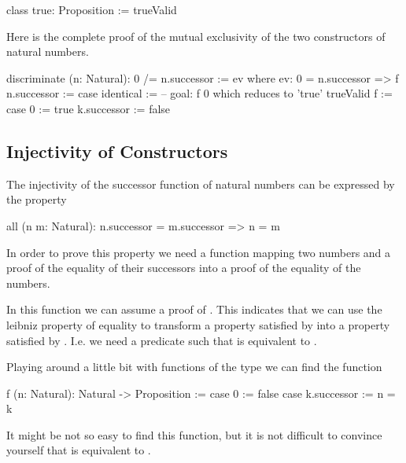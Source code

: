 \begin{alba}
    class true: Proposition := trueValid
\end{alba}


Here is the complete proof of the mutual exclusivity of the two constructors of
natural numbers.


\begin{alba}
    discriminate (n: Natural): 0 /= n.successor
    :=
        ev
        where
            ev: 0 = n.successor => f n.successor :=
                case
                    identical :=
                        -- goal: f 0  which reduces to 'true'
                        trueValid
            f :=
                case
                    0 := true
                    k.successor := false
\end{alba}





\subsection{Injectivity of Constructors}

The injectivity of the successor function of natural numbers can be expressed
by the property

\begin{alba}
    all (n m: Natural): n.successor = m.successor  =>  n = m
\end{alba}

In order to prove this property we need a function mapping two numbers and a
proof of the equality of their successors into a proof of the equality of the
numbers.

In this function we can assume a proof of . This
indicates that we can use the leibniz property of equality to transform a
property satisfied by  into a property satisfied by
.  I.e. we need a predicate  such that  is equivalent to .

Playing around a little bit with functions of the type  we can find the function

\begin{alba}
    f (n: Natural): Natural -> Proposition :=
        case 0 :=
            false
        case k.successor :=
            n = k
\end{alba}

It might be not so easy to find this function, but it is not difficult to
convince yourself that  is equivalent to .

